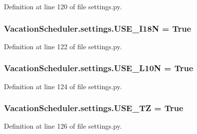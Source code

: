 Definition at line 120 of file settings.\-py.

\hypertarget{namespaceVacationScheduler_1_1settings_ad425eda1a47d223d12f91c591d99fce0}{
\subsubsection[{U\-S\-E\-\_\-\-I18\-N}]{\setlength{\rightskip}{0pt plus 5cm}Vacation\-Scheduler.\-settings.\-U\-S\-E\-\_\-\-I18\-N = True}}\label{namespaceVacationScheduler_1_1settings_ad425eda1a47d223d12f91c591d99fce0}


Definition at line 122 of file settings.\-py.

\hypertarget{namespaceVacationScheduler_1_1settings_a1ebb32e4d2ecadff2efd497b6d64c125}{
\subsubsection[{U\-S\-E\-\_\-\-L10\-N}]{\setlength{\rightskip}{0pt plus 5cm}Vacation\-Scheduler.\-settings.\-U\-S\-E\-\_\-\-L10\-N = True}}\label{namespaceVacationScheduler_1_1settings_a1ebb32e4d2ecadff2efd497b6d64c125}


Definition at line 124 of file settings.\-py.

\hypertarget{namespaceVacationScheduler_1_1settings_ad3ca21478ba5c956be88507ad1cf40bf}{
\subsubsection[{U\-S\-E\-\_\-\-T\-Z}]{\setlength{\rightskip}{0pt plus 5cm}Vacation\-Scheduler.\-settings.\-U\-S\-E\-\_\-\-T\-Z = True}}\label{namespaceVacationScheduler_1_1settings_ad3ca21478ba5c956be88507ad1cf40bf}


Definition at line 126 of file settings.\-py.

